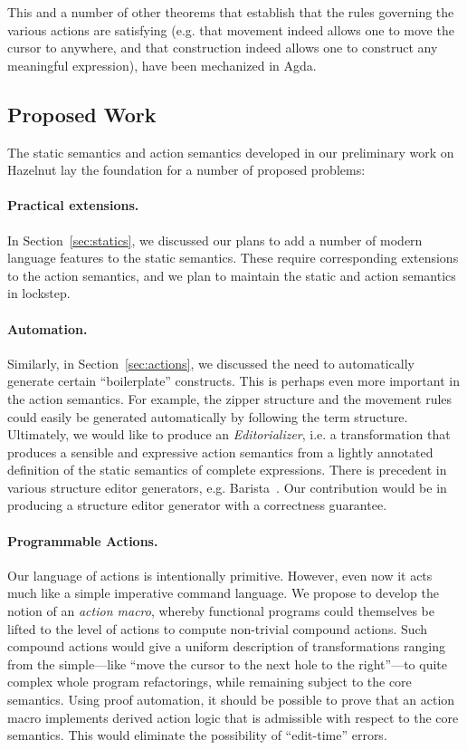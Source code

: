 This and a number of other theorems that establish that the rules governing
the various actions are satisfying (e.g. that movement indeed allows one 
to move the cursor to anywhere, and that construction indeed allows one 
to construct any meaningful expression), have been mechanized in Agda.




\subsection{Proposed Work}
The static semantics and action semantics developed in our preliminary work on Hazelnut lay the foundation for a number of proposed problems:

\paragraph{Practical extensions.} In Section~\ref{sec:statics}, we
discussed our plans to add a number of modern language features to the static
semantics. These require corresponding extensions to the action semantics, and
we plan to maintain the static and action semantics in lockstep. 

\paragraph{Automation.} Similarly, in Section~\ref{sec:actions}, we
discussed the need to automatically generate certain ``boilerplate''
constructs. This is perhaps even more important in the action semantics. For
example, the zipper structure and the movement rules could easily be generated
automatically by following the term structure. Ultimately, we would like to
produce an \emph{Editorializer}, i.e. a transformation that produces a sensible
and expressive action semantics from a lightly annotated definition of the
static semantics of complete expressions. There is precedent in various
structure editor generators, e.g. Barista~\cite{ko_barista:_2006}. Our
contribution would be in producing a structure editor generator with a
correctness guarantee. 

\paragraph{Programmable Actions.} Our language of actions is intentionally primitive. However, even now it
acts much like a simple imperative command language. We propose to develop the
notion of an \emph{action macro}, whereby 
functional programs could themselves be lifted to the level of actions to
compute non-trivial compound actions. Such compound actions would give a
uniform description of transformations ranging from the simple---like
``move the cursor to the next hole to the right''---to quite complex whole
program refactorings, while remaining subject to the core semantics. Using proof automation, it should be possible to prove that an action macro implements derived action logic that 
is admissible with respect to the core semantics. This would eliminate the possibility of ``edit-time'' errors.

